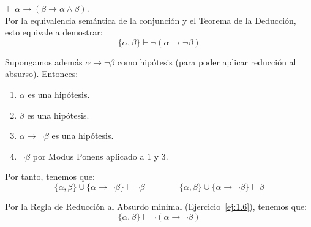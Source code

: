 \begin{ejercicio}\label{ej:1.27}
    $\vdash \alpha \rightarrow (\beta \rightarrow \alpha \land \beta)$.\\

    Por la equivalencia semántica de la conjunción y el Teorema de la Deducción, esto equivale a demostrar:
    \begin{equation*}
        \{\alpha,\beta\} \vdash \neg(\alpha\rightarrow\neg\beta)
    \end{equation*}

    Supongamos además $\alpha\rightarrow\neg\beta$ como hipótesis (para poder aplicar reducción al absurso). Entonces:
    \begin{enumerate}
        \item $\alpha$ es una hipótesis.
        \item $\beta$ es una hipótesis.
        \item $\alpha\rightarrow\neg\beta$ es una hipótesis.
        \item $\neg\beta$ por Modus Ponens aplicado a $1$ y $3$.
    \end{enumerate}

    Por tanto, tenemos que:
    \begin{equation*}
        \{\alpha,\beta\}\cup \{\alpha\rightarrow\neg\beta\} \vdash \neg\beta\qquad\qquad \{\alpha,\beta\}\cup \{\alpha\rightarrow\neg\beta\} \vdash \beta
    \end{equation*}

    Por la Regla de Reducción al Absurdo minimal (Ejercicio~\ref{ej:1.6}), tenemos que:
    \begin{equation*}
        \{\alpha,\beta\} \vdash \neg(\alpha\rightarrow\neg\beta)
    \end{equation*}
\end{ejercicio}

